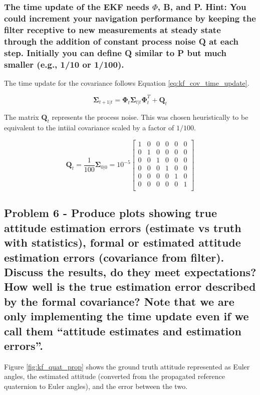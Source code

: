 \subsubsection{The time update of the EKF needs $\Phi$, B, and P. Hint: You could increment your navigation performance by keeping the filter receptive to new measurements at steady state through the addition of constant process noise Q at each step. Initially you can define Q similar to P but much smaller (e.g., 1/10 or 1/100).}

The time update for the covariance follows Equation \ref{eq:kf_cov_time_update}.

\begin{equation} \label{eq:kf_cov_time_update}
    \boldsymbol{\Sigma}_{t + 1 \vert t} = \boldsymbol{\Phi}_t \boldsymbol{\Sigma}_{t \vert t} \boldsymbol{\Phi}_t^T + \boldsymbol{Q}_t
\end{equation}

The matrix $\boldsymbol{Q}_t$ represents the process noise. This was chosen heuristically to be equivalent to the intiial covariance scaled by a factor of $1/100$. 

\begin{equation*}
    \boldsymbol{Q}_t = \frac{1}{100} \boldsymbol{\Sigma}_{0 \vert 0} = 10^{-5} \begin{bmatrix}
        1 & 0 & 0 & 0 & 0 & 0 \\
        0 & 1 & 0 & 0 & 0 & 0 \\
        0 & 0 & 1 & 0 & 0 & 0 \\
        0 & 0 & 0 & 1 & 0 & 0 \\
        0 & 0 & 0 & 0 & 1 & 0 \\
        0 & 0 & 0 & 0 & 0 & 1 \\
    \end{bmatrix}
\end{equation*}

\subsection{Problem 6 - Produce plots showing true attitude estimation errors (estimate vs truth with statistics), formal or estimated attitude estimation errors (covariance from filter). Discuss the results, do they meet expectations? How well is the true estimation error described by the formal covariance? Note that we are only implementing the time update even if we call them “attitude estimates and estimation errors”.}

Figure \ref{fig:kf_quat_prop} shows the ground truth attitude represented as Euler angles, the estimated attitude (converted from the propagated reference quaternion to Euler angles), and the error between the two.

